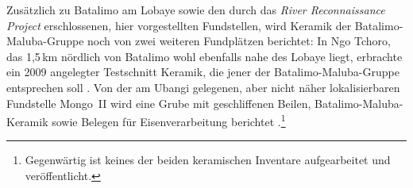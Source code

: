 Zusätzlich zu Batalimo am Lobaye \parencite{deBayledesHermens.1975} sowie den durch das \textit{River Reconnaissance Project} erschlossenen, hier vorgestellten Fundstellen, wird Keramik der Batalimo-Maluba-Gruppe noch von zwei weiteren Fundplätzen berichtet: In Ngo Tchoro, das 1,5\,km nördlich von Batalimo wohl ebenfalls nahe des Lobaye liegt, erbrachte ein 2009 angelegter Testschnitt Keramik, die jener der Batalimo-Maluba-Gruppe entsprechen soll \parencite{Ndanga.2010}. Von der am \mbox{Ubangi} gelegenen, aber nicht näher lokalisierbaren Fundstelle Mongo~II wird eine Grube mit geschliffenen Beilen, Batalimo-Maluba-Keramik sowie Belegen für Eisenverarbeitung berichtet \parencite{Ndanga.20120623}.\footnote{Gegenwärtig ist keines der beiden keramischen Inventare aufgearbeitet und veröffentlicht.}